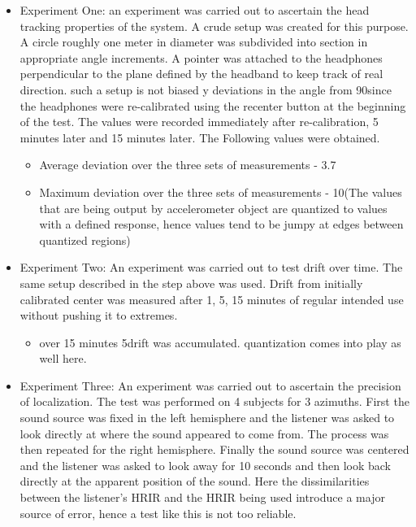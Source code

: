 \documentclass[a4paper,12pt,oneside]{article}
\begin{document}
\begin{itemize}
\item Experiment One: an experiment was carried out to ascertain the head tracking properties of the system. A crude setup was created for this purpose. A circle roughly one meter in diameter was subdivided into section in appropriate angle increments. A pointer was attached to the headphones perpendicular to the plane defined by the headband to keep track of real direction. such a setup is not biased y deviations in the angle from 90\degree since the headphones were re-calibrated using the recenter button at the beginning  of the test. The values were recorded immediately after re-calibration, 5 minutes later and 15 minutes later. The Following values were obtained.

\begin {center}
\begin {itemize}

\item Average deviation over the three sets of measurements - 3.7\degree 
\item Maximum deviation over the three sets of measurements - 10\degree  (The values that are being output by accelerometer object are quantized to values with a defined response, hence values tend to be jumpy at edges between quantized regions)

\end{itemize}
\end {center}

\item Experiment Two: An experiment was carried out to test drift over time. The same setup described in the step above was used. Drift from initially calibrated center was measured after 1, 5, 15 minutes of regular intended use without pushing it to extremes.\\

\begin{center}
\begin {itemize}

\item over 15 minutes 5\degree  drift was accumulated. quantization comes into play as well here.

\end {itemize}
\end{center}

\item Experiment Three: An experiment was carried out to ascertain the precision of localization. The test was performed on 4 subjects for 3 azimuths. First the sound source was fixed in the left hemisphere and the listener was asked to look directly at where the sound appeared to come from. The process was then repeated for the right hemisphere. Finally the sound source was centered and the listener was asked to look away for 10 seconds and then look back directly at the apparent position of the sound. Here the dissimilarities between the listener's HRIR and the HRIR being used introduce a major source of error, hence a test like this is not too reliable.


\end{itemize}
\end{document}

